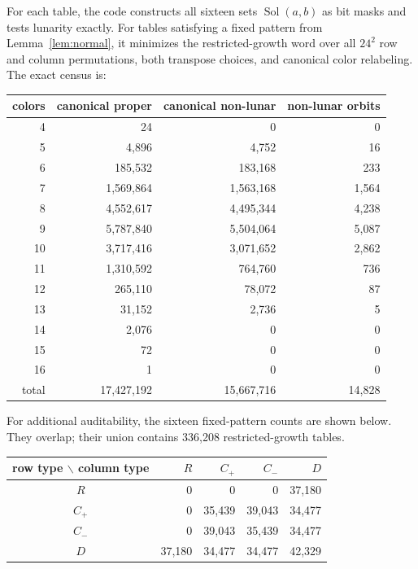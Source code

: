 \documentclass[11pt]{article}
\newcommand{\Sol}{\operatorname{Sol}}
\begin{document}
For each table, the code constructs all sixteen sets $\Sol(a,b)$ as bit masks
and tests lunarity exactly.  For tables satisfying a fixed pattern from
Lemma~\ref{lem:normal}, it minimizes the restricted-growth word over all
$24^2$ row and column permutations, both transpose choices, and canonical
color relabeling.  The exact census is:

\begin{center}
\small
\begin{tabular}{@{}rrrr@{}}
\toprule
colors & canonical proper & canonical non-lunar & non-lunar orbits\\
\midrule
4  & 24        & 0         & 0\\
5  & 4,896     & 4,752     & 16\\
6  & 185,532   & 183,168   & 233\\
7  & 1,569,864 & 1,563,168 & 1,564\\
8  & 4,552,617 & 4,495,344 & 4,238\\
9  & 5,787,840 & 5,504,064 & 5,087\\
10 & 3,717,416 & 3,071,652 & 2,862\\
11 & 1,310,592 & 764,760   & 736\\
12 & 265,110   & 78,072    & 87\\
13 & 31,152    & 2,736     & 5\\
14 & 2,076     & 0         & 0\\
15 & 72        & 0         & 0\\
16 & 1         & 0         & 0\\
\midrule
total & 17,427,192 & 15,667,716 & 14,828\\
\bottomrule
\end{tabular}
\end{center}

For additional auditability, the sixteen fixed-pattern counts are shown
below.  They overlap; their union contains 336,208 restricted-growth tables.

\begin{center}
\begin{tabular}{@{}c rrrr@{}}
\toprule
row type $\backslash$ column type & $R$ & $C_+$ & $C_-$ & $D$\\
\midrule
$R$   & 0      & 0      & 0      & 37,180\\
$C_+$ & 0      & 35,439 & 39,043 & 34,477\\
$C_-$ & 0      & 39,043 & 35,439 & 34,477\\
$D$   & 37,180 & 34,477 & 34,477 & 42,329\\
\bottomrule
\end{tabular}
\end{center}
\end{document}
